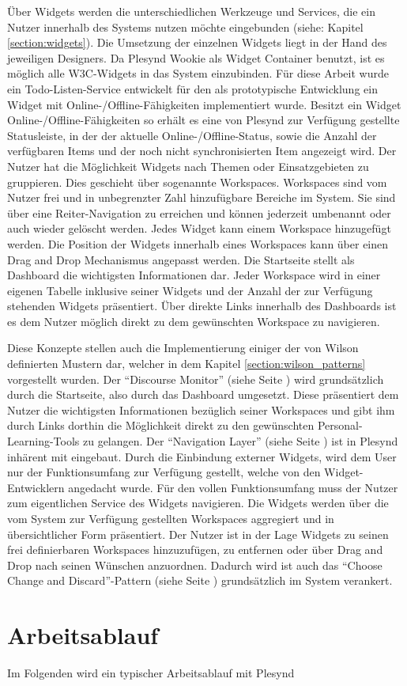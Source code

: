 Über Widgets werden die unterschiedlichen Werkzeuge und Services, die ein Nutzer innerhalb des Systems nutzen möchte eingebunden (siehe: Kapitel \ref{section:widgets}). Die Umsetzung der einzelnen Widgets liegt in der Hand des jeweiligen Designers. Da Plesynd Wookie als Widget Container benutzt, ist es möglich alle W3C-Widgets in das System einzubinden. Für diese Arbeit wurde ein Todo-Listen-Service entwickelt für den als prototypische Entwicklung ein Widget mit Online-/Offline-Fähigkeiten implementiert wurde. Besitzt ein Widget Online-/Offline-Fähigkeiten so erhält es eine von Plesynd zur Verfügung gestellte Statusleiste, in der der aktuelle Online-/Offline-Status, sowie die Anzahl der verfügbaren Items und der noch nicht synchronisierten Item angezeigt wird. Der Nutzer hat die Möglichkeit Widgets nach Themen oder Einsatzgebieten zu gruppieren. Dies geschieht über sogenannte Workspaces. Workspaces sind vom Nutzer frei und in unbegrenzter Zahl hinzufügbare Bereiche im System. Sie sind über eine Reiter-Navigation zu erreichen und können jederzeit umbenannt oder auch wieder gelöscht werden. Jedes Widget kann einem Workspace hinzugefügt werden. Die Position der Widgets innerhalb eines Workspaces kann über einen Drag and Drop Mechanismus angepasst werden. Die Startseite stellt als Dashboard die wichtigsten Informationen dar. Jeder Workspace wird in einer eigenen Tabelle inklusive seiner Widgets und der Anzahl der zur Verfügung stehenden Widgets präsentiert. Über direkte Links innerhalb des Dashboards ist es dem Nutzer möglich direkt zu dem gewünschten Workspace zu navigieren.

Diese Konzepte stellen auch die Implementierung einiger der von Wilson definierten Mustern dar, welcher in dem Kapitel \ref{section:wilson_patterns} vorgestellt wurden.  Der "`Discourse Monitor"' (siehe Seite \pageref{wilson_patterns:discourse_monitor}) wird grundsätzlich durch die Startseite, also durch das Dashboard umgesetzt. Diese präsentiert dem Nutzer die wichtigsten Informationen bezüglich seiner Workspaces und gibt ihm durch Links dorthin die Möglichkeit direkt zu den gewünschten Personal-Learning-Tools zu gelangen. Der "`Navigation Layer"' (siehe Seite \pageref{wilson_patterns:navigation_layer}) ist in Plesynd inhärent mit eingebaut. Durch die Einbindung externer Widgets, wird dem User nur der Funktionsumfang zur Verfügung gestellt, welche von den Widget-Entwicklern angedacht wurde. Für den vollen Funktionsumfang muss der Nutzer zum eigentlichen Service des Widgets navigieren. Die Widgets werden über die vom System zur Verfügung gestellten Workspaces aggregiert und in übersichtlicher Form präsentiert. Der Nutzer ist in der Lage Widgets zu seinen frei definierbaren Workspaces hinzuzufügen, zu entfernen oder über Drag and Drop nach seinen Wünschen anzuordnen. Dadurch wird ist auch das "`Choose Change and Discard"'-Pattern (siehe Seite \pageref{wilson_patterns:choose_change_discard}) grundsätzlich im System verankert.



\section{Arbeitsablauf}
Im Folgenden wird ein typischer Arbeitsablauf mit Plesynd





